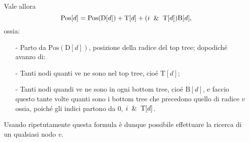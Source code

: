 Vale allora \[\mbox{Pos}[d]=\mbox{Pos}(\mbox{D}[d])+\mbox{T}[d]+(i\And \mbox{T}[d])\mbox{B}[d],\] ossia:
\begin{itemize}
\item[-] Parto da $\mbox{Pos}(\mbox{D}[d])$, posizione della radice del top tree; dopodiché avanzo di:
\item[-] Tanti nodi quanti ve ne sono nel top tree, cioé $\mbox{T}[d]$;
\item[-] Tanti nodi quandi ve ne sono in ogni bottom tree, cioé $\mbox{B}[d]$, e faccio questo tante volte quanti sono i bottom tree che precedono quello di radice $v$ ossia, poiché gli indici partono da 0, $i\And \mbox{T}[d]$.
\end{itemize}
Usando ripetutamente questa formula è dunque possibile effettuare la ricerca di un qualsiasi nodo $v$.
